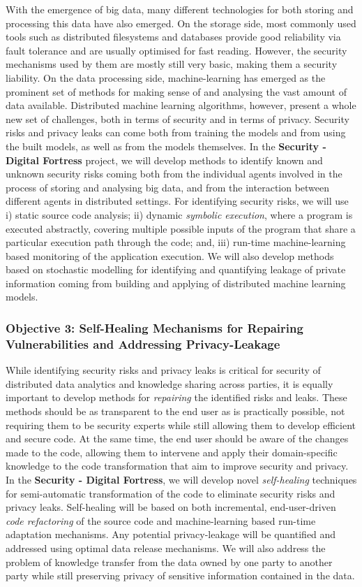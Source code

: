 \documentclass[a4paper,11pt]{article}
\newcommand{\project}[1]{\textbf{#1}\xspace}
\newcommand{\SECURITY}{\project{Security - Digital Fortress}}
\newcommand{\TheProject}{\SECURITY}
\begin{document}
With the emergence of big data, many different technologies for both storing and processing this data have also emerged. On the storage side, most commonly used tools such as distributed filesystems and databases provide good reliability via fault tolerance and are usually optimised for fast reading. However, the security mechanisms used by them are mostly still very basic, making them a security liability. On the data processing side, machine-learning has emerged as the prominent set of methods for making sense of and analysing the vast amount of data available. Distributed machine learning algorithms, however, present a whole new set of challenges, both in terms of security and in terms of privacy. Security risks and privacy leaks can come both from training the models and from using the built models, as well as from the models themselves. In the \TheProject{} project, we will develop methods to identify known and unknown security risks coming both from the individual agents involved in the process of storing and analysing big data, and from the interaction between different agents in distributed settings. For identifying security risks, we will use i) static source code analysis; ii) dynamic \emph{symbolic execution}, where a program is executed abstractly, covering multiple possible inputs of the program that share a particular execution path through the code; and, iii) run-time machine-learning based monitoring of the application execution. We will also develop methods based on stochastic modelling for identifying and quantifying leakage of private information coming from building and applying of distributed machine learning models.

\subsubsection*{Objective 3: Self-Healing Mechanisms for Repairing Vulnerabilities and Addressing Privacy-Leakage}
While identifying security risks and privacy leaks is critical for security of distributed data analytics and knowledge sharing across parties, it is equally important to develop methods for \emph{repairing} the identified risks and leaks. These methods should be as transparent to the end user as is practically possible, not requiring them to be security experts while still allowing them to develop efficient and secure code. At the same time, the end user should be aware of the changes made to the code, allowing them to intervene and apply their domain-specific knowledge to the code transformation that aim to improve security and privacy. In the \TheProject{}, we will develop novel \emph{self-healing} techniques for semi-automatic transformation of the code to eliminate security risks and privacy leaks. Self-healing will be based on both incremental, end-user-driven \emph{code refactoring} of the source code and machine-learning based run-time adaptation mechanisms. Any potential privacy-leakage will be quantified and addressed using optimal data release mechanisms. We will also address the problem of knowledge transfer from the data owned by one party to another party while still preserving privacy of sensitive information contained in the data. 
\end{document}
